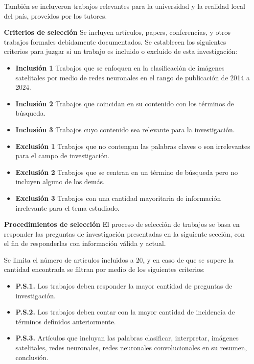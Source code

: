 También se incluyeron trabajos relevantes para la universidad y la realidad local del país, proveídos por los tutores.

{\bf Criterios de selección} Se incluyen artículos, papers, conferencias, y otros trabajos formales debidamente documentados. Se establecen los siguientes criterios para juzgar si un trabajo es incluido o excluido de esta investigación:

\vspace{-\topsep}
\begin{itemize}
    \setlength{\parskip}{0pt}
    \setlength{\itemsep}{0pt plus 1pt}
    \item[] {\bf Inclusión 1} Trabajos que se enfoquen en la clasificación de imágenes satelitales por medio de redes neuronales en el rango de publicación de 2014 a 2024.
    \item[] {\bf Inclusión 2} Trabajos que coincidan en su contenido con los términos de búsqueda.
    \item[] {\bf Inclusión 3} Trabajos cuyo contenido sea relevante para la investigación.
    \item[] {\bf Exclusión 1} Trabajos que no contengan las palabras claves o son irrelevantes para el campo de investigación.
    \item[] {\bf Exclusión 2} Trabajos que se centran en un término de búsqueda pero no incluyen alguno de los demás.
    \item[] {\bf Exclusión 3} Trabajos con una cantidad mayoritaria de información irrelevante para el tema estudiado.
\end{itemize}
\vspace{-\topsep}

{\bf Procedimientos de selección} El proceso de selección de trabajos se basa en responder las preguntas de investigación presentadas en la siguiente sección, con el fin de responderlas con información válida y actual.

Se limita el número de artículos incluidos a 20, y en caso de que se supere la cantidad encontrada se filtran por medio de los siguientes criterios:

\begin{itemize}
    \item[] {\bf P.S.1.} Los trabajos deben responder la mayor cantidad de preguntas de investigación.
    \item[] {\bf P.S.2.} Los trabajos deben contar con la mayor cantidad de incidencia de términos definidos anteriormente.
    \item[] {\bf P.S.3.} Artículos que incluyan las palabras clasificar, interpretar, imágenes satelitales, redes neuronales, redes neuronales convolucionales en su resumen, conclusión.
\end{itemize}

